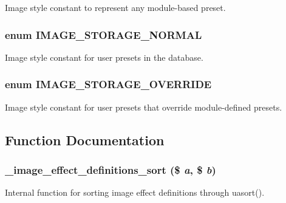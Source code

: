 \label{image_8module_a5eeb2eba5576aacf25051422d667de24}
Image style constant to represent any module-\/based preset. \hypertarget{image_8module_a1b56f6b9594bbb7ab736ebcb17dfb6e0}{
\subsubsection[{IMAGE\_\-STORAGE\_\-NORMAL}]{\setlength{\rightskip}{0pt plus 5cm}enum {\bf IMAGE\_\-STORAGE\_\-NORMAL}}}
\label{image_8module_a1b56f6b9594bbb7ab736ebcb17dfb6e0}
Image style constant for user presets in the database. \hypertarget{image_8module_adfb4172c27b27b4689c40abb24d61ebe}{
\subsubsection[{IMAGE\_\-STORAGE\_\-OVERRIDE}]{\setlength{\rightskip}{0pt plus 5cm}enum {\bf IMAGE\_\-STORAGE\_\-OVERRIDE}}}
\label{image_8module_adfb4172c27b27b4689c40abb24d61ebe}
Image style constant for user presets that override module-\/defined presets. 

\subsection{Function Documentation}
\hypertarget{image_8module_ac764a8c22c22632edf4633c68b6f3223}{
\subsubsection[{\_\-image\_\-effect\_\-definitions\_\-sort}]{\setlength{\rightskip}{0pt plus 5cm}\_\-image\_\-effect\_\-definitions\_\-sort (\$ {\em a}, \/  \$ {\em b})}}
\label{image_8module_ac764a8c22c22632edf4633c68b6f3223}
Internal function for sorting image effect definitions through uasort().

